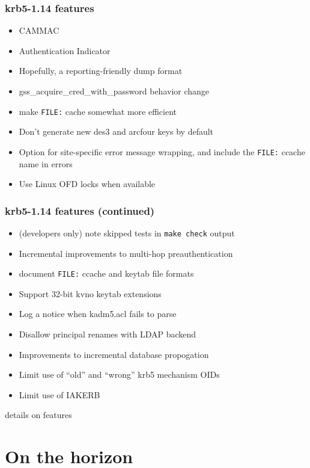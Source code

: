 \documentclass{beamer}
\begin{document}
\begin{frame}[fragile]
\frametitle{krb5-1.14 features}
\begin{itemize}
\item{CAMMAC}
\item{Authentication Indicator}
\item{Hopefully, a reporting-friendly dump format}
\item{gss\_acquire\_cred\_with\_password behavior change}
\item{make \verb+FILE:+ cache somewhat more efficient}
\item{Don't generate new des3 and arcfour keys by default}
\item{Option for site-specific error message wrapping, and include the
	\verb+FILE:+ ccache name in errors}
\item{Use Linux OFD locks when available}
\end{itemize}
\end{frame}
\begin{frame}[fragile]
\frametitle{krb5-1.14 features (continued)}
\begin{itemize}
\item{(developers only) note skipped tests in \verb+make check+ output}
\item{Incremental improvements to multi-hop preauthentication}
\item{document \verb+FILE:+ ccache and keytab file formats}
\item{Support 32-bit kvno keytab extensions}
\item{Log a notice when kadm5.acl fails to parse}
\item{Disallow principal renames with LDAP backend}
\item{Improvements to incremental database propogation}
\item{Limit use of ``old'' and ``wrong'' krb5 mechanism OIDs}
\item{Limit use of IAKERB}
\end{itemize}
\end{frame}

\begin{frame}
details on features
\end{frame}

\section{On the horizon}
\end{document}
